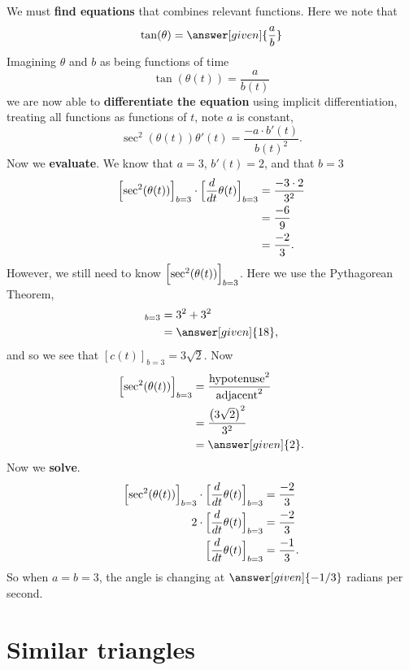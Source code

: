 \documentclass{ximera}
\begin{document}
\begin{example}
\begin{explanation}
    We must \textbf{find equations} that combines relevant
    functions. Here we note that
    \[
    \tan(\theta) = \answer[given]{\frac{a}{b}}
    \]
    Imagining $\theta$ and $b$ as being functions of time
    \[
    \tan(\theta(t)) = \frac{a}{b(t)}
    \]
    we are now able to \textbf{differentiate the equation} using
    implicit differentiation, treating all functions as functions of
    $t$, note $a$ is constant,
    \[
    \sec^2(\theta(t))\theta'(t) = \frac{-a\cdot b'(t)}{b(t)^2}.
    \]
    Now we \textbf{evaluate}.  We
    know that $a=3$, $b'(t) = 2$, and that $b = 3$
    \begin{align*}
    \Bigl[\sec^2(\theta(t))\Bigr]_{b=3}\cdot \Bigl[\dfrac{d}{dt}\theta(t)\Bigr]_{b=3} &= \frac{-3\cdot 2}{3^2}\\
    &= \frac{-6}{9}\\
    &= \frac{-2}{3}.
    \end{align*}
    However, we still need to know $ \Bigl[\sec^2(\theta(t))\Bigr]_{b=3}$. Here we use the
    Pythagorean Theorem,
    \begin{align*}
    [c^2(t)]_{b=3} &= 3^2 + 3^2\\
    &=\answer[given]{18},
    \end{align*}
    and so we see that $[c(t)]_{b=3} = 3\sqrt{2}$. Now
    \begin{align*}
     \Bigl[\sec^2(\theta(t))\Bigr]_{b=3} &= \frac{\mathrm{hypotenuse}^2}{\mathrm{adjacent}^2}\\
      &= \frac{\left(3\sqrt{2}\right)^2}{3^2}\\
      &= \answer[given]{2}.
    \end{align*}
   Now we \textbf{solve}.
    \begin{align*}
    \Bigl[\sec^2(\theta(t))\Bigr]_{b=3}\cdot \Bigl[\dfrac{d}{dt}\theta(t)\Bigr]_{b=3}  &= \frac{-2}{3}\\
      2\cdot \Bigl[\dfrac{d}{dt}\theta(t)\Bigr]_{b=3}  &= \frac{-2}{3}\\
     \Bigl[\dfrac{d}{dt}\theta(t)\Bigr]_{b=3} &= \frac{-1}{3}.
    \end{align*}
    So when $a=b=3$, the angle is changing at $\answer[given]{-1/3}$
    radians per second.
  \end{explanation}
\end{example}



\section{Similar triangles}
\end{document}
